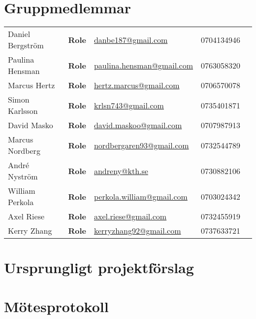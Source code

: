 \renewcommand{\appendixtocname}{Appendix}
\renewcommand{\appendixpagename}{Appendix}
\begin{appendices}
\section{Gruppmedlemmar}

\begin{tabular}{lllll}
  Daniel Bergström & \textbf{Role} & \href{mailto:danbe187@gmail.com}{danbe187@gmail.com} & 0704134946 \\
  Paulina Hensman & \textbf{Role} & \href{mailto:paulina.hensman@gmail.com}{paulina.hensman@gmail.com} & 0763058320 \\
  Marcus Hertz & \textbf{Role} & \href{mailto:hertz.marcus@gmail.com}{hertz.marcus@gmail.com} & 0706570078 \\
  Simon Karlsson & \textbf{Role} & \href{mailto:krlsn743@gmail.com}{krlsn743@gmail.com} & 0735401871 \\
  David Masko & \textbf{Role} & \href{mailto:david.maskoo@gmail.com}{david.maskoo@gmail.com} & 0707987913 \\
  Marcus Nordberg & \textbf{Role} & \href{mailto:nordbergaren93@gmail.com}{nordbergaren93@gmail.com} & 0732544789 \\
  André Nyström & \textbf{Role} & \href{mailto:crazybanana3255@gmail.com}{andreny@kth.se} & 0730882106 \\
  William Perkola & \textbf{Role} & \href{mailto:perkola.william@gmail.com}{perkola.william@gmail.com} & 0703024342 \\
  Axel Riese & \textbf{Role} & \href{mailto:axel.riese@gmail.com}{axel.riese@gmail.com} & 0732455919 \\
  Kerry Zhang & \textbf{Role} & \href{mailto:kerryzhang92@gmail.com}{kerryzhang92@gmail.com} & 0737633721 \\
\end{tabular}

\section{Ursprungligt projektförslag}


\section{Mötesprotokoll}





\end{appendices}
